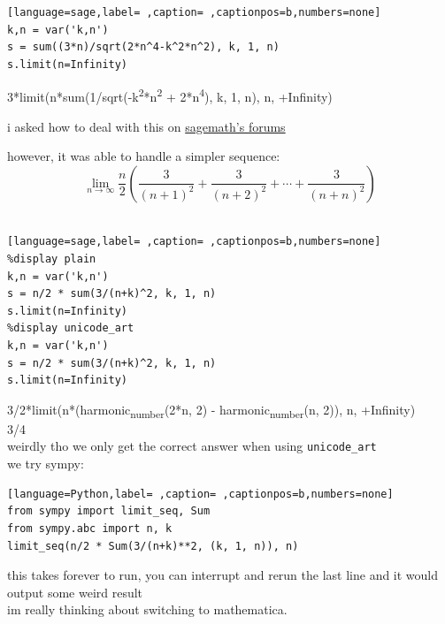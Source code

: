 \documentclass[a4paper,12pt]{article}
\begin{document}
\begin{lstlisting}[language=sage,label= ,caption= ,captionpos=b,numbers=none]
k,n = var('k,n')
s = sum((3*n)/sqrt(2*n^4-k^2*n^2), k, 1, n)
s.limit(n=Infinity)
\end{lstlisting}

3*limit(n*sum(1/sqrt(-k\textsuperscript{2}*n\textsuperscript{2} + 2*n\textsuperscript{4}), k, 1, n), n, +Infinity)\\[0pt]

\begin{note}
i asked how to deal with this on \href{https://ask.sagemath.org/question/62497/limit-of-sequence/}{sagemath's forums}\\[0pt]
\end{note}

however, it was able to handle a simpler sequence:\\[0pt]

\[
  \lim_{n\to\infty} \frac{n}{2}\left(\frac{3}{(n+1)^2} + \frac{3}{(n+2)^2} + \cdots + \frac{3}{(n+n)^2}\right)
\]\\[0pt]

\begin{lstlisting}[language=sage,label= ,caption= ,captionpos=b,numbers=none]
%display plain
k,n = var('k,n')
s = n/2 * sum(3/(n+k)^2, k, 1, n)
s.limit(n=Infinity)
%display unicode_art
k,n = var('k,n')
s = n/2 * sum(3/(n+k)^2, k, 1, n)
s.limit(n=Infinity)
\end{lstlisting}

3/2*limit(n*(harmonic\textsubscript{number}(2*n, 2) - harmonic\textsubscript{number}(n, 2)), n, +Infinity)\\[0pt]
3/4\\[0pt]

weirdly tho we only get the correct answer when using \texttt{unicode\_art}\\[0pt]

we try sympy:\\[0pt]

\begin{lstlisting}[language=Python,label= ,caption= ,captionpos=b,numbers=none]
from sympy import limit_seq, Sum
from sympy.abc import n, k
limit_seq(n/2 * Sum(3/(n+k)**2, (k, 1, n)), n)
\end{lstlisting}

this takes forever to run, you can interrupt and rerun the last line and it would output some weird result\\[0pt]

im really thinking about switching to mathematica.\\[0pt]
\end{document}
